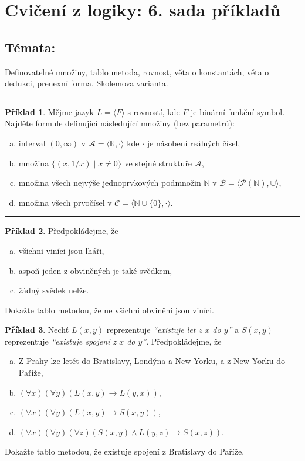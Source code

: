 \documentclass{amsart}
\theoremstyle{definition}
\newtheorem{problem}{Příklad}
\theoremstyle{remark}
\begin{document}
\section*{Cvičení z logiky: 6. sada příkladů}

\medskip

\subsection*{Témata:}  Definovatelné množiny, tablo metoda, rovnost, věta o konstantách, věta o dedukci, prenexní forma, Skolemova varianta.

\medskip
\hrule

\begin{problem}
Mějme jazyk $L=\langle F \rangle$ s rovností, kde $F$ je binární funkční symbol. Najděte formule definující následující množiny (bez parametrů):
\begin{enumerate}[(a)]
\itemsep6pt
    \item interval $(0,\infty)$ v $\mathcal A=\langle\mathbb R, \cdot\rangle$ kde $\cdot$ je násobení reálných čísel,
    \item množina $\{(x, 1/x)\mid x\neq 0\}$ ve stejné struktuře $\mathcal A$,
    \item množina všech nejvýše jednoprvkových podmnožin $\mathbb N$ v $\mathcal B=\langle\mathcal P(\mathbb N),\cup\rangle$,
    \item množina všech prvočísel v $\mathcal C=\langle \mathbb N\cup\{0\}, \cdot\rangle$.
\end{enumerate}

\end{problem}

\medskip
\hrule

\begin{problem}
Předpokládejme, že
\begin{enumerate}[(a)]
\itemsep6pt
\item všichni viníci jsou lháři,
\item aspoň jeden z obviněných je také svědkem,
\item žádný svědek nelže.
\end{enumerate}
Dokažte tablo metodou, že ne všichni obvinění jsou viníci.
\end{problem} 



\begin{problem} Nechť $L(x,y)$ reprezentuje \emph{``existuje let z $x$ do $y$''} a $S(x,y)$ reprezentuje \emph{``existuje spojení z $x$ do $y$''}. Předpokládejme, že
\begin{enumerate}[(a)]
\itemsep6pt
\item Z Prahy lze letět do Bratislavy, Londýna a New Yorku, a z New Yorku do Paříže,
\item $(\forall x)(\forall y)(L(x,y) \to L(y,x))$,
\item $(\forall x)(\forall y)(L(x,y)\to S(x,y))$,
\item $(\forall x)(\forall y)(\forall z)(S(x,y)\wedge L(y,z)\to S(x,z))$.
\end{enumerate}
Dokažte tablo metodou, že existuje spojení z Bratislavy do Paříže.
\end{problem} 
\end{document}

